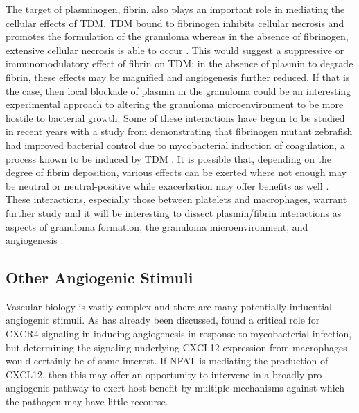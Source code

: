The target of plasminogen, fibrin, also plays an important role in mediating the cellular effects of TDM. TDM bound to fibrinogen inhibits cellular necrosis and promotes the formulation of the granuloma whereas in the absence of fibrinogen, extensive cellular necrosis is able to occur \citep{Sakamoto2010}. This would suggest a suppressive or immunomodulatory effect of fibrin on TDM; in the absence of plasmin to degrade fibrin, these effects may be magnified and angiogenesis further reduced. If that is the case, then local blockade of plasmin in the granuloma could be an interesting experimental approach to altering the granuloma microenvironment to be more hostile to bacterial growth. Some of these interactions have begun to be studied in recent years with a study from \citet{Hortle2019} demonstrating that fibrinogen mutant zebrafish had improved bacterial control due to mycobacterial induction of coagulation, a process known to be induced by TDM \citep{Retzinger1982, Retzinger1987, Donnachie2016}. It is possible that, depending on the degree of fibrin deposition, various effects can be exerted where not enough may be neutral or neutral\hyp{}positive while exacerbation may offer benefits as well \citep{Venkatasubramanian2016}. These interactions, especially those between platelets and macrophages, warrant further study and it will be interesting to dissect plasmin/fibrin interactions as aspects of granuloma formation, the granuloma microenvironment, and angiogenesis \citep{Feng2014, LugoVillarino2014}.

\subsection{Other Angiogenic Stimuli}\label{otherang}

Vascular biology is vastly complex and there are many potentially influential angiogenic stimuli. As has already been discussed, \citet{Torraca2017} found a critical role for CXCR4 signaling in inducing angiogenesis in response to mycobacterial infection, but determining the signaling underlying CXCL12 expression from macrophages would certainly be of some interest. If NFAT is mediating the production of CXCL12, then this may offer an opportunity to intervene in a broadly pro\hyp{}angiogenic pathway to exert host benefit by multiple mechanisms against which the pathogen may have little recourse. 


